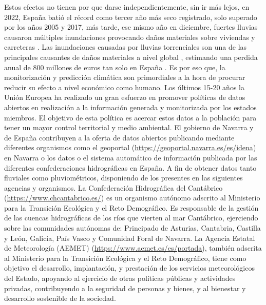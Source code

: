 Estos efectos no tienen por que darse independientemente, sin ir más lejos, en 2022, España batió el récord como tercer año más seco registrado, solo superado por los años 2005 y 2017, más tarde, ese mismo año en diciembre, fuertes lluvias causaron múltiples inundaciones provocando daños materiales sobre viviendas y carreteras \cite{NCEIWebPreci}.\newline
\newline
Las inundaciones causadas por lluvias torrenciales son una de las principales causantes de daños materiales a nivel global \cite{wasko2021incorporating}, estimando una perdida anual de 800 millones de euros tan solo en España \cite{Miteco}. Es por eso que, la monitorización y predicción climática son primordiales a la hora de procurar reducir su efecto a nivel económico como humano.\newline
\newline
Los últimos 15-20 años la Unión Europea ha realizado un gran esfuerzo en promover políticas de datos abiertos en realización a la información generada y monitorizada por los estados miembros. El objetivo de esta política es acercar estos datos a la población para tener un mayor control territorial y medio ambiental. El gobierno de Navarra y de España contribuyen a la oferta de datos abiertos publicando mediante diferentes organismos como el geoportal (\url{https://geoportal.navarra.es/es/idena}) en Navarra o los datos o el sistema automático de información publicada por las diferentes confederaciones hidrográficas en España.\newline
\newline
A fin de obtener datos tanto fluviales como pluviométricos, disponiendo de los presentes en las siguientes agencias y organismos.\newline
\newline
La Confederación Hidrográfica del Cantábrico (\url{https://www.chcantabrico.es/}) es un organismo autónomo adscrito al Ministerio para la Transición Ecológica y el Reto Demográfico. Es responsable de la gestión de las cuencas hidrográficas de los ríos que vierten al mar Cantábrico, ejerciendo sobre las comunidades autónomas de: Principado de Asturias, Cantabria, Castilla y León, Galicia, País Vasco y Comunidad Foral de Navarra.\newline
\newline
La Agencia Estatal de Meteorología (AEMET) (\url{https://www.aemet.es/es/portada}), también adscrita al Ministerio para la Transición Ecológica y el Reto Demográfico, tiene como objetivo el desarrollo, implantación, y prestación de los servicios meteorológicos del Estado, apoyando al ejercicio de otras políticas públicas y actividades privadas, contribuyendo a la seguridad de personas y bienes, y al bienestar y desarrollo sostenible de la sociedad.\newline
